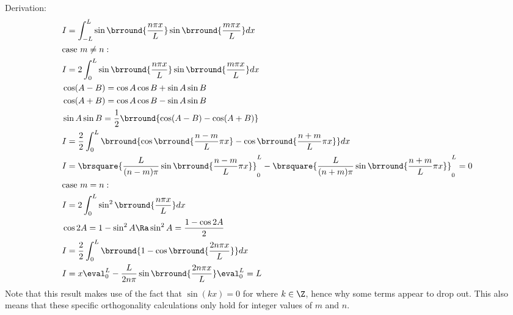 Derivation:
\begin{align*}
    &I=\int_{-L}^L\sin\brround{\frac{n\pi x}{L}}\sin\brround{\frac{m\pi x}{L}}dx\\
    &\text{case }m\neq n:\\
    &I=2\int_{0}^L\sin\brround{\frac{n\pi x}{L}}\sin\brround{\frac{m\pi x}{L}}dx\\
    &\cos(A-B)=\cos A\cos B+\sin A\sin B\\
    &\cos(A+B)=\cos A\cos B-\sin A\sin B\\
    &\sin A\sin B=\frac{1}{2}\brround{\cos(A-B)-\cos(A+B)}\\
    &I=\frac{2}{2}\int_0^L\brround{\cos\brround{\frac{n-m}{L}\pi x}-\cos\brround{\frac{n+m}{L}\pi x}}dx\\
    &I=\brsquare{\frac{L}{(n-m)\pi}\sin\brround{\frac{n-m}{L}\pi x}}_0^L-\brsquare{\frac{L}{(n+m)\pi}\sin\brround{\frac{n+m}{L}\pi x}}_0^L=0\\
    &\text{case }m=n:\\
    &I=2\int_0^L\sin^2\brround{\frac{n\pi x}{L}}dx\\
    &\cos 2A=1-\sin^2A\Ra \sin^2 A=\frac{1-\cos 2A}{2}\\
    &I=\frac{2}{2}\int_0^L\brround{1-\cos\brround{\frac{2n\pi x}{L}}}dx\\
    &I={x}\eval_0^L-{\frac{L}{2n\pi}\sin\brround{\frac{2n\pi x}{L}}}\eval_0^L=L
\end{align*}
Note that this result makes use of the fact that $\sin(kx)=0$ for where $k\in\Z$, hence why some terms appear to drop out. This also means that these specific orthogonality calculations only hold for integer values of $m$ and $n$.

